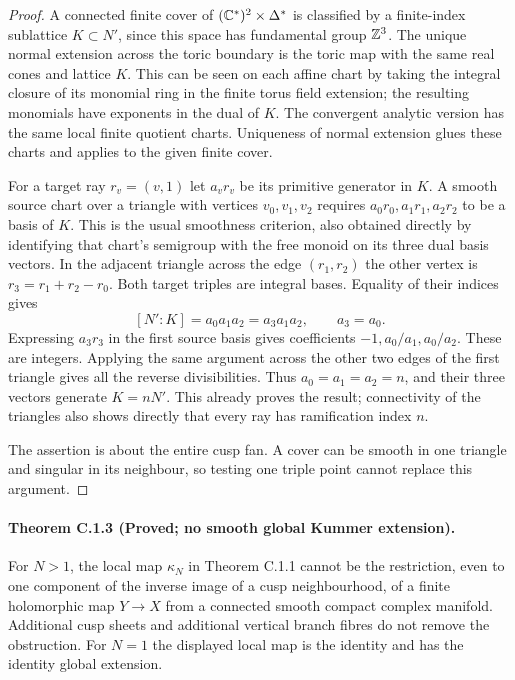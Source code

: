 \begin{proof}
A connected finite cover of $(\mathbb C^*)^2\times\Delta^*$ is classified by
a finite-index sublattice $K\subset N'$, since this space has fundamental
group $\mathbb Z^3$. The unique normal extension across the toric boundary is
the toric map with the same real cones and lattice $K$. This can be seen
on each affine chart by taking the integral closure of its monomial ring
in the finite torus field extension; the resulting monomials have
exponents in the dual of $K$. The convergent analytic version has the
same local finite quotient charts. Uniqueness of normal extension glues
these charts and applies to the given finite cover.

For a target ray $r_v=(v,1)$ let $a_vr_v$ be its primitive generator in
$K$. A smooth source chart over a triangle with vertices $v_0,v_1,v_2$
requires $a_0r_0,a_1r_1,a_2r_2$ to be a basis of $K$. This is the usual
smoothness criterion, also obtained directly by identifying that chart's
semigroup with the free monoid on its three dual basis vectors.
In the adjacent triangle across the edge $(r_1,r_2)$ the other vertex is
$r_3=r_1+r_2-r_0$. Both target triples are integral bases. Equality of
their indices gives
\[
 [N':K]=a_0a_1a_2=a_3a_1a_2,
 \qquad a_3=a_0.
\]
Expressing $a_3r_3$ in the first source basis gives coefficients
$-1,a_0/a_1,a_0/a_2$. These are integers. Applying the same argument
across the other two edges of the first triangle gives all the reverse
divisibilities. Thus $a_0=a_1=a_2=n$, and their three vectors generate
$K=nN'$. This already proves the result; connectivity of the triangles
also shows directly that every ray has ramification index $n$.

The assertion is about the entire cusp fan. A cover can be smooth in
one triangle and singular in its neighbour, so testing one triple point
cannot replace this argument.
\end{proof}

\paragraph{Theorem C.1.3 (Proved; no smooth global Kummer extension).}
For $N>1$, the local map $\kappa_N$ in Theorem C.1.1 cannot be the
restriction, even to one component of the inverse image of a cusp
neighbourhood, of a finite holomorphic map $Y\to X$ from a connected
smooth compact complex manifold. Additional cusp sheets and additional
vertical branch fibres do not remove the obstruction. For $N=1$ the
displayed local map is the identity and has the identity global extension.

